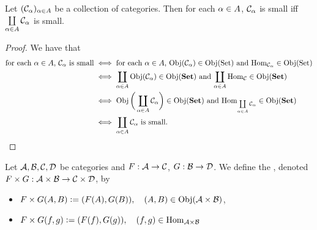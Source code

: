 \documentclass{book}
\begin{document}
	\begin{ex} 
		Let $(\mathcal{C}_{\alpha})_{\alpha \in A}$ be a collection of categories. Then for each $\alpha \in A$, $\mathcal{C}_{\alpha}$ is small iff $\coprod\limits_{\alpha \in A} \mathcal{C}_{\alpha}$ is small.
	\end{ex}
	
	\begin{proof}
		We have that 
		\begin{align*}
			\text{for each $\alpha \in A$, $\mathcal{C}_{\alpha}$ is small}
			& \iff \text{for each $\alpha \in A$, $\operatorname{Obj}(\mathcal{C}_{\alpha}) \in \operatorname{Obj}(\text{Set})$ and $\operatorname{Hom}_{\mathcal{C}_{\alpha}} \in \operatorname{Obj}(\text{Set})$} \\
			& \iff \text{$ \coprod\limits_{\alpha \in A} \operatorname{Obj}(\mathcal{C}_{\alpha}) \in \operatorname{Obj}(\text{\textbf{Set}})$ and $\coprod\limits_{\alpha \in A} \operatorname{Hom}_{\mathcal{C}} \in \operatorname{Obj}(\text{\textbf{Set}})$} \\
			& \iff \text{$ \operatorname{Obj} \bigg(\coprod\limits_{\alpha \in A} \mathcal{C}_{\alpha} \bigg) \in \operatorname{Obj}(\text{\textbf{Set}})$ and $\operatorname{Hom}_{\coprod\limits_{\alpha \in A} \mathcal{C}_{\alpha}} \in \operatorname{Obj}(\text{\textbf{Set}})$} \\
			& \iff \text{$ \coprod\limits_{\alpha \in A} \mathcal{C}_{\alpha}$ is small}.
		\end{align*}
	\end{proof}
	
	
	
	
	
	
	
	
	
	
	
	
	
	
	
	
	
	
	
	
	
	
	
	
	
	
	
	
	
	
	
	
	
	
	
	
	
	
	
	
	
	
	\begin{defn} 
		Let $\mathcal{A}, \mathcal{B}, \mathcal{C}, \mathcal{D}$ be categories and $F: \mathcal{A} \rightarrow \mathcal{C}$, $G: \mathcal{B} \rightarrow \mathcal{D}$. We define the , denoted $F \times G: \mathcal{A} \times \mathcal{B} \rightarrow  \mathcal{C} \times \mathcal{D}$, by 
		\begin{itemize}
			\item $F \times G(A, B) \vcentcolon= (F(A), G(B)), \quad (A, B) \in \operatorname{Obj}(\mathcal{A} \times \mathcal{B})$,  
			\item $F \times G(f,g) \vcentcolon= (F(f), G(g)), \quad (f,g) \in \operatorname{Hom}_{\mathcal{A} \times \mathcal{B}}$
		\end{itemize}
	\end{defn}
	
\end{document}
